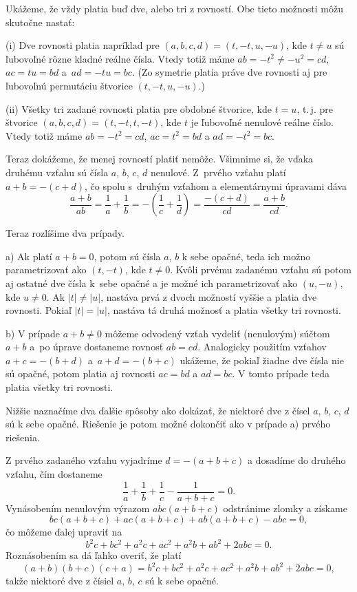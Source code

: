 {%
Ukážeme, že vždy platia buď dve, alebo tri z rovností. Obe tieto možnosti môžu skutočne nastať:

\smallskip
\item{(i)} Dve rovnosti platia napríklad pre $(a,b,c,d)=(t,{-t},u,{-u})$, kde $t\ne u$ sú ľubovoľné rôzne kladné reálne čísla. Vtedy totiž máme $ab={-t^2}\ne {-u^2}=cd$, $ac=tu=bd$ a~$ad={-tu}=bc$. (Zo symetrie platia práve dve rovnosti aj pre ľubovoľnú permutáciu štvorice $(t,{-t},u,{-u})$.)
\item{(ii)} Všetky tri zadané rovnosti platia pre obdobné štvorice, kde $t=u$, t.\,j. pre štvorice $(a,b,c,d)={(t,{-t},t,{-t})}$, kde $t$ je ľubovoľné nenulové reálne číslo. Vtedy totiž máme $ab={-t^2}=cd$, $ac=t^2=bd$ a $ad={-t^2}=bc$.

\smallskip\noindent
Teraz dokážeme, že menej rovností platiť nemôže. Všimnime si, že vďaka druhému vzťahu sú čísla $a$, $b$, $c$, $d$ nenulové.
Z~prvého vzťahu platí $a+b = {-(c+d)}$,
čo spolu s~druhým vzťahom a elementárnymi úpravami dáva
$$\frac{a+b}{ab}=\frac1a+\frac1b = -\left(\frac1c+\frac1d\right) = \frac{-(c+d)}{cd} = \frac{a+b}{cd}.$$

Teraz rozlíšime dva prípady.

\smallskip
\item{a)} Ak platí $a+b=0$, potom sú čísla $a$, $b$ k sebe opačné, teda ich možno parametrizovať ako $(t,{-t})$, kde $t\ne 0$. Kvôli prvému zadanému vzťahu sú potom aj ostatné dve čísla k~sebe opačné a je možné ich parametrizovať ako $(u,{-u})$, kde $u\ne 0$.
Ak $|t|\ne |u|$, nastáva prvá z dvoch možností vyššie a platia dve rovnosti.
Pokiaľ $|t|=|u|$, nastáva tá druhá možnosť a platia všetky tri rovnosti.
\item{b)} V prípade $a+b\ne 0$ môžeme odvodený vzťah vydeliť (nenulovým) súčtom $a+b$ a~po úprave dostaneme rovnosť $ab=cd$. Analogicky použitím vzťahov $a+c = {-(b+d)}$ a~$a+d={-(b+c)}$ ukážeme, že pokiaľ žiadne dve čísla nie sú opačné, potom platia aj rovnosti $ac=bd$ a $ad=bc$. V tomto prípade teda platia všetky tri rovnosti.

\poznamka
Nižšie naznačíme dva ďalšie spôsoby ako dokázať, že niektoré dve z čísel $a$, $b$, $c$, $d$ sú k sebe opačné. Riešenie je potom možné dokončiť ako v prípade a) prvého riešenia.

\ineriesenie
Z prvého zadaného vzťahu vyjadríme $d={-(a+b+c)}$ a dosadíme do druhého vzťahu, čím dostaneme
$$\frac1a+\frac1b+\frac1c-\frac{1}{a+b+c}=0.$$
Vynásobením nenulovým výrazom $abc(a+b+c)$ odstránime zlomky a získame
$$ bc(a+b+c) + ac(a+b+c)+ab(a+b+c) - abc = 0,$$
čo môžeme ďalej upraviť na
$$ b^2c+bc^2 + a^2c+ac^2 + a^2b+ab^2 + 2abc =0.$$
Roznásobením sa dá ľahko overiť, že platí $$(a+b)(b+c)(c+a) = b^2c+bc^2 + a^2c+ac^2 + a^2b+ab^2 + 2abc =0,$$
takže niektoré dve z čísiel $a$, $b$, $c$ sú k sebe opačné.

}
